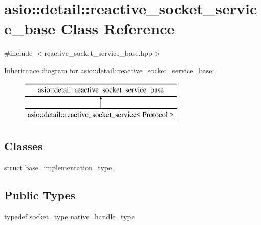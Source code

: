 \hypertarget{classasio_1_1detail_1_1reactive__socket__service__base}{}\section{asio\+:\+:detail\+:\+:reactive\+\_\+socket\+\_\+service\+\_\+base Class Reference}
\label{classasio_1_1detail_1_1reactive__socket__service__base}


{\ttfamily \#include $<$reactive\+\_\+socket\+\_\+service\+\_\+base.\+hpp$>$}

Inheritance diagram for asio\+:\+:detail\+:\+:reactive\+\_\+socket\+\_\+service\+\_\+base\+:\begin{figure}[H]
\begin{center}
\leavevmode
\includegraphics[height=2.000000cm]{classasio_1_1detail_1_1reactive__socket__service__base}
\end{center}
\end{figure}
\subsection*{Classes}
\begin{DoxyCompactItemize}
\item 
struct \hyperlink{structasio_1_1detail_1_1reactive__socket__service__base_1_1base__implementation__type}{base\+\_\+implementation\+\_\+type}
\end{DoxyCompactItemize}
\subsection*{Public Types}
\begin{DoxyCompactItemize}
\item 
typedef \hyperlink{namespaceasio_1_1detail_a6798c771dd84b79798b1a08150706ea9}{socket\+\_\+type} \hyperlink{classasio_1_1detail_1_1reactive__socket__service__base_a7838f400a17a0a3e0fd1c78040f4da53}{native\+\_\+handle\+\_\+type}
\end{DoxyCompactItemize}
